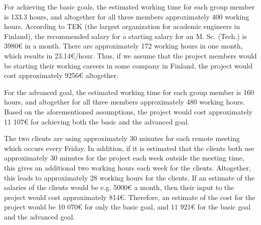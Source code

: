 For achieving the basic goals, the estimated working time for each group member is 133.3 hours, and altogether for
all three members approximately 400 working hours. According to TEK (the largest organization for academic engineers
in Finland), the recommended salary for a starting salary for an M. Sc. (Tech.) is 3980€ in a month. There are 
approximately 172 working hours in one month, which results in 23.14€/hour. Thus, if we assume that the project
members would be starting their working careers in some company in Finland, the project would cost approximately
9256€ altogether.

For the advanced goal, the estimated working time for each group member is 160 hours, and altogether for all three
members approximately 480 working hours. Based on the aforementioned assumptions, the project would cost
approximately 11 107€ for achieving both the basic and the advanced goal.

The two clients are using approximately 30 minutes for each remote meeting which occurs every Friday. In addition,
if it is estimated that the clients both use approximately 30 minutes for the project each week outside the meeting
time, this gives an additional two working hours each week for the clients. Altogether, this leads to approximately
28 working hours for the clients. If an estimate of the salaries of the clients would be e.g. 5000€ a month, then
their input to the project would cost approximately 814€. Therefore, an estimate of the cost for the project would
be 10 070€ for only the basic goal, and 11 921€ for the basic goal and the advanced goal.